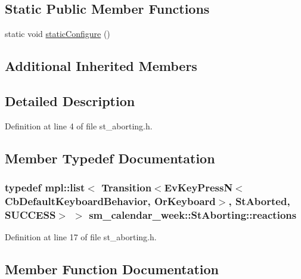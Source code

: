 \subsection*{Static Public Member Functions}
\begin{DoxyCompactItemize}
\item 
static void \hyperlink{structsm__calendar__week_1_1StAborting_a9a01fcc6fc9a0ad300e1956fcb31095e}{static\+Configure} ()
\end{DoxyCompactItemize}
\subsection*{Additional Inherited Members}


\subsection{Detailed Description}


Definition at line 4 of file st\+\_\+aborting.\+h.



\subsection{Member Typedef Documentation}
\subsubsection[{\texorpdfstring{reactions}{reactions}}]{\setlength{\rightskip}{0pt plus 5cm}typedef mpl\+::list$<$ Transition$<$Ev\+Key\+PressN$<$Cb\+Default\+Keyboard\+Behavior, {\bf Or\+Keyboard}$>$, {\bf St\+Aborted}, {\bf S\+U\+C\+C\+E\+SS}$>$ $>$ {\bf sm\+\_\+calendar\+\_\+week\+::\+St\+Aborting\+::reactions}}\hypertarget{structsm__calendar__week_1_1StAborting_a68b769addbd4194bd5263a32d639d891}{}\label{structsm__calendar__week_1_1StAborting_a68b769addbd4194bd5263a32d639d891}


Definition at line 17 of file st\+\_\+aborting.\+h.



\subsection{Member Function Documentation}
